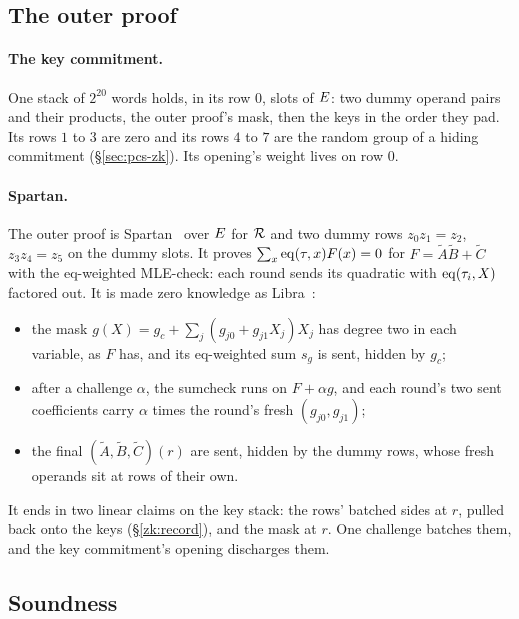 \subsection{The outer proof}\label{zk:outer}\label{zk:keys}

\paragraph{The key commitment.} One stack of $2^{20}$ words holds, in its row $0$, slots of $E$: two dummy operand pairs and their products, the outer proof's mask, then the keys in the order they pad. Its rows $1$ to $3$ are zero and its rows $4$ to $7$ are the random group of a hiding commitment (\S\ref{sec:pcs-zk}). Its opening's weight lives on row $0$.

\paragraph{Spartan.} The outer proof is Spartan~\cite{Set20} over $E$ for $\mathcal{R}$ and two dummy rows $z_0 z_1 = z_2$, $z_3 z_4 = z_5$ on the dummy slots. It proves $\sum_x \operatorname{eq}(\tau, x) F(x) = 0$ for $F = \tilde A \tilde B + \tilde C$ with the eq-weighted MLE-check: each round sends its quadratic with $\operatorname{eq}(\tau_i, X)$ factored out. It is made zero knowledge as Libra~\cite{XZZPS19}:
\begin{itemize}[itemsep=1pt,topsep=2pt]
\item the mask $g(X) = g_c + \sum_j (g_{j0} + g_{j1} X_j) X_j$ has degree two in each variable, as $F$ has, and its eq-weighted sum $s_g$ is sent, hidden by $g_c$;
\item after a challenge $\alpha$, the sumcheck runs on $F + \alpha g$, and each round's two sent coefficients carry $\alpha$ times the round's fresh $(g_{j0}, g_{j1})$;
\item the final $(\tilde A, \tilde B, \tilde C)(r)$ are sent, hidden by the dummy rows, whose fresh operands sit at rows of their own.
\end{itemize}
It ends in two linear claims on the key stack: the rows' batched sides at $r$, pulled back onto the keys (\S\ref{zk:record}), and the mask at $r$. One challenge batches them, and the key commitment's opening discharges them.

\subsection{Soundness}\label{zk:soundness}

